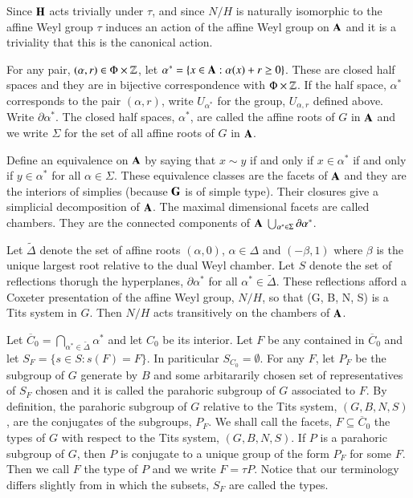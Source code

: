 Since $\mathbf{H}$ acts trivially under $\tau$, and since $N/H$ is naturally isomorphic to the affine Weyl group $\tau$ induces an action of the affine Weyl group on $\mathbf{A}$ and it is a triviality that this is the canonical action. 

For any pair, $(\alpha, r) \in \Phi \times \mathbb{Z}$, let $\alpha^{*} = \{x \in \mathbf{A} : \alpha(x) + r \geq 0\}$. These are closed half spaces and they are in bijective correspondence with $\Phi \times \mathbb{Z}$. If the half space, $\alpha^{*}$ corresponds to the pair $(\alpha, r)$, write $U_{\alpha^{*}}$ for the group, $U_{\alpha, r}$ defined above. Write $\partial\alpha^{*}$. The closed half spaces, $\alpha^{*}$, are called the affine roots of $G$ in $\mathbf{A}$ and we write $\Sigma$ for the set of all affine roots of $G$ in $\mathbf{A}$.

Define an equivalence on $\mathbf{A}$ by saying that $x\sim y$ if and only if $x \in \alpha^{*}$ if and only if $y \in \alpha^{*}$ for all $\alpha \in \Sigma$. These equivalence classes are the facets of $\mathbf{A}$ and they are the interiors of simplies (because $\mathbf{G}$ is of simple type). Their closures give a simplicial decomposition of $\mathbf{A}$. The maximal dimensional facets are called chambers. They are the connected components of $\mathbf{A}\ \bigcup_{\alpha^{*} \in \Sigma}\partial \alpha^{*}$.

Let $\tilde{\Delta}$ denote the set of affine roots $(\alpha, 0)$, $\alpha \in \Delta$ and $(-\beta, 1)$ where $\beta$ is the unique largest root relative to the dual Weyl chamber. Let $S$ denote the set of reflections thorugh the hyperplanes, $\partial\alpha^{*}$ for all $\alpha^{*} \in \tilde{\Delta}$. These reflections afford a Coxeter presentation of the affine Weyl group, $N/H$, so that (G, B, N, S) is a Tits system in $G$. Then $N/H$ acts transitively on the chambers of $\mathbf{A}$.

Let $\overline{C}_{0} = \bigcap_{\alpha^{*} \in \tilde{\Delta}} \alpha^{*}$ and let $C_{0}$ be its interior. Let $F$ be any contained in $\overline{C}_{0}$ and let $S_{F} = \{ s \in S : s(F) = F \}$. In pariticular $S_{C_{0}} = \emptyset$. For any $F$, let $P_{F}$ be the subgroup of $G$ generate by $B$ and some arbitararily chosen set of representatives of $S_{F}$ chosen and it is called the parahoric subgroup of $G$ associated to $F$. By definition, the parahoric subgroup of $G$ relative to the Tits system, $(G, B, N, S)$, are the conjugates of the subgroups, $P_{F}$. We shall call the facets, $F \subseteq \overline{C}_{0}$ the types of $G$ with respect to the Tits system, $(G, B, N, S)$. If $P$ is a parahoric subgroup of $G$, then $P$ is conjugate to a unique group of the form $P_{F}$ for some $F$. Then we call $F$ the type of $P$ and we write $F= \tau{P}$. Notice that our terminology differs slightly from \cite{art6-keyBT-I} in which the subsets, $S_{F}$ are called the types. 

